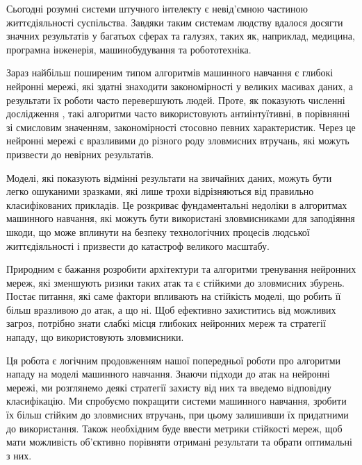 \documentclass[14pt,a4paper]{extarticle}
\newcounter{e}
\numberwithin{equation}{section}
\numberwithin{figure}{section}
\begin{document}
Сьогодні розумні системи штучного інтелекту є невід'ємною частиною життєдіяльності суспільства. Завдяки таким системам людству вдалося досягти значних результатів у багатьох сферах та галузях, таких як, наприклад, медицина, програмна інженерія, машинобудування та робототехніка.

Зараз найбільш поширеним типом алгоритмів машинного навчання є глибокі нейронні мережі, які здатні знаходити закономірності у великих масивах даних, а результати їх роботи часто перевершують людей. Проте, як показують численні дослідження \cite{first-work}, такі алгоритми часто використовують антиінтуїтивні, в порівнянні зі смисловим значенням, закономірності стосовно певних характеристик. Через це нейронні мережі є вразливими до різного роду зловмисних втручань, які можуть призвести до невірних результатів.

Моделі, які показують відмінні результати на звичайних даних, можуть бути легко ошуканими зразками, які лише трохи відрізняються від правильно класифікованих прикладів. Це розкриває фундаментальні недоліки в алгоритмах машинного навчання, які можуть бути використані зловмисниками для заподіяння шкоди, що може вплинути на безпеку технологічних процесів людської життєдіяльності і призвести до катастроф великого масштабу.

Природним є бажання розробити архітектури та алгоритми тренування нейронних мереж, які зменшують ризики таких атак та є стійкими до зловмисних збурень. Постає питання, які саме фактори впливають на стійкість моделі, що робить її більш вразливою до атак, а що ні. Щоб ефективно захиститись від можливих загроз, потрібно знати слабкі місця глибоких нейронних мереж та стратегії нападу, що використовують зловмисники.

Ця робота є логічним продовженням нашої попередньої роботи \cite{my-work} про алгоритми нападу на моделі машинного навчання. Знаючи підходи до атак на нейронні мережі, ми розглянемо деякі стратегії захисту від них та введемо відповідну класифікацію. Ми спробуємо покращити системи машинного навчання, зробити їх більш стійким до зловмисних втручань, при цьому залишивши їх придатними до використання. Також необхідним буде ввести метрики стійкості мереж, щоб мати можливість об'єктивно порівняти отримані результати та обрати оптимальні з них.

\end{document}
